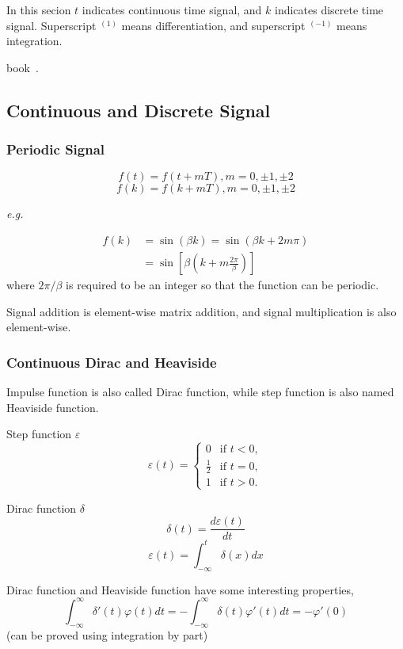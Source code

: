 In this secion $t$ indicates continuous time signal,
and $k$ indicates discrete time signal.
Superscript $^{(1)}$ means differentiation, and
superscript $^{(-1)}$ means integration.

book~\cite{bib:dsp}.

\subsection{Continuous and Discrete Signal}

 \subsubsection{Periodic Signal}

 \[ f(t) = f(t + mT), m = 0, \pm 1, \pm 2 \]
 \[ f(k) = f(k + mT), m = 0, \pm 1, \pm 2 \]

 \emph{e.g.}

 \begin{align*}
	 f(k) & = \sin(\beta k) = \sin(\beta k + 2m\pi) \\
	 & = \sin [ \beta ( k + m \frac{2\pi}{\beta})]
 \end{align*}
 where $2\pi/\beta$ is required to be an integer so that the function
 can be periodic.

 Signal addition is element-wise matrix addition, and signal
 multiplication is also element-wise.

 \subsubsection{Continuous Dirac and Heaviside}

 Impulse function is also called Dirac function, while
 step function is also named Heaviside function.

 Step function $\varepsilon$
 \[ \varepsilon(t) = \left\{ \begin{array}{rl}
		 0 & \text{if } t < 0,\\
		 \frac{1}{2} & \text{if } t = 0,\\
		 1 & \text{if } t > 0.
		 \end{array}\right.
 \]

 Dirac function $\delta$
 \[ \delta(t) = \frac{d\varepsilon(t)}{dt} \]
 \[ \varepsilon(t) = \int_{-\infty}^t \delta(x) dx \]

 Dirac function and Heaviside function have some interesting properties,
 \[ \int_{-\infty}^{\infty} \delta'(t) \varphi(t)dt = -\int_{-\infty}^\infty \delta(t)\varphi'(t)dt = -\varphi'(0) \]
 (can be proved using integration by part)


